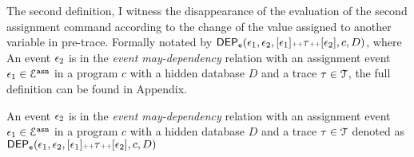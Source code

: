  The second definition, I witness the disappearance of the evaluation of the second assignment command  according to the change of the value assigned to another variable in pre-trace.
%
Formally notated by  $\mathsf{DEP_{\mathtt{e}}}(\mathtt{\epsilon}_1, \mathtt{\epsilon}_2, [\mathtt{\epsilon}_1 ] {\scriptscriptstyle ++} \mathtt{\tau} {\scriptscriptstyle ++} [\mathtt{\epsilon}_2], c, D)$,
where An event $\mathtt{\epsilon}_2$ is in the \emph{event may-dependency} relation with an assignment
event $\mathtt{\epsilon}_1 \in \mathcal{E}^{\mathtt{{asn}}}$ in a program ${c}$
with a hidden database $D$ and a trace $\mathtt{\tau} \in \mathcal{T}$, the full definition can be found in Appendix.
\begin{defn}
\label{def:event_dep}
  An event $\mathtt{\epsilon}_2$ is in the \emph{event may-dependency} relation with an assignment
  event $\mathtt{\epsilon}_1 \in \mathcal{E}^{\mathtt{{asn}}}$ in a program ${c}$
  with a hidden database $D$ and a trace $\mathtt{\tau} \in \mathcal{T}$ denoted as 
  $\mathsf{DEP_{\mathtt{e}}}(\mathtt{\epsilon}_1, \mathtt{\epsilon}_2, [\mathtt{\epsilon}_1 ] {\scriptscriptstyle ++} \mathtt{\tau} {\scriptscriptstyle ++} [\mathtt{\epsilon}_2], c, D)$

\end{defn}
